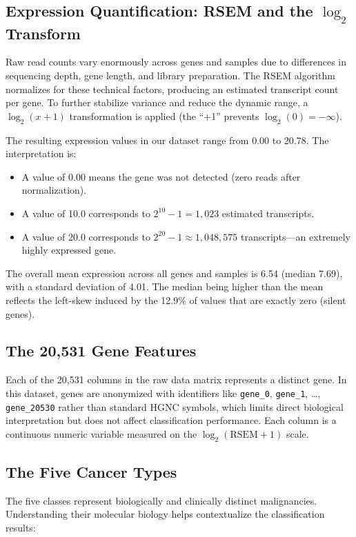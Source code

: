 \documentclass{article}
\begin{document}
\subsection{Expression Quantification: RSEM and the $\log_2$ Transform}
Raw read counts vary enormously across genes and samples due to differences in sequencing depth, gene length, and library preparation. The RSEM algorithm \citep{li2011rsem} normalizes for these technical factors, producing an estimated transcript count per gene. To further stabilize variance and reduce the dynamic range, a $\log_2(x + 1)$ transformation is applied (the ``+1'' prevents $\log_2(0) = -\infty$).

The resulting expression values in our dataset range from 0.00 to 20.78. The interpretation is:
\begin{itemize}[leftmargin=2em]
\item A value of 0.00 means the gene was not detected (zero reads after normalization).
\item A value of 10.0 corresponds to $2^{10} - 1 = 1{,}023$ estimated transcripts.
\item A value of 20.0 corresponds to $2^{20} - 1 \approx 1{,}048{,}575$ transcripts---an extremely highly expressed gene.
\end{itemize}
The overall mean expression across all genes and samples is 6.54 (median 7.69), with a standard deviation of 4.01. The median being higher than the mean reflects the left-skew induced by the 12.9\% of values that are exactly zero (silent genes).

\subsection{The 20{,}531 Gene Features}
Each of the 20{,}531 columns in the raw data matrix represents a distinct gene. In this dataset, genes are anonymized with identifiers like \texttt{gene\_0}, \texttt{gene\_1}, \ldots, \texttt{gene\_20530} rather than standard HGNC symbols, which limits direct biological interpretation but does not affect classification performance. Each column is a continuous numeric variable measured on the $\log_2(\text{RSEM}+1)$ scale.

\subsection{The Five Cancer Types}
The five classes represent biologically and clinically distinct malignancies. Understanding their molecular biology helps contextualize the classification results:
\end{document}
